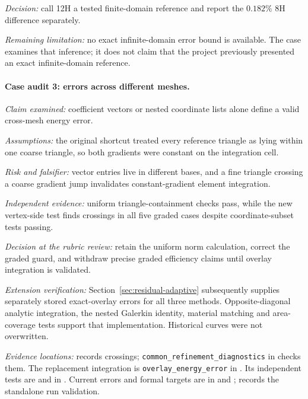 \documentclass[11pt]{article}
\begin{document}
\noindent\textit{Decision:} call 12H a tested finite-domain reference and report the $0.182\%$ 8H difference separately.

\noindent\textit{Remaining limitation:} no exact infinite-domain error bound is available. The case examines that inference; it does not claim that the project previously presented an exact infinite-domain reference.

\newpage
\paragraph{Case audit 3: errors across different meshes.}

\noindent\textit{Claim examined:} coefficient vectors or nested coordinate lists alone define a valid cross-mesh energy error.

\noindent\textit{Assumptions:} the original shortcut treated every reference triangle as lying within one coarse triangle, so both gradients were constant on the integration cell.

\noindent\textit{Risk and falsifier:} vector entries live in different bases, and a fine triangle crossing a coarse gradient jump invalidates constant-gradient element integration.

\noindent\textit{Independent evidence:} uniform triangle-containment checks pass, while the new vertex-side test finds crossings in all five graded cases despite coordinate-subset tests passing.

\noindent\textit{Decision at the rubric review:} retain the uniform norm calculation, correct the graded guard, and withdraw precise graded efficiency claims until overlay integration is validated.

\noindent\textit{Extension verification:} Section~\ref{sec:residual-adaptive} subsequently supplies separately stored exact-overlay errors for all three methods. Opposite-diagonal analytic integration, the nested Galerkin identity, material matching and area-coverage tests support that implementation. Historical curves were not overwritten.

\begin{sloppypar}
\noindent\textit{Evidence locations:}  records crossings; \texttt{common\_refinement\_diagnostics} in  checks them. The replacement integration is \texttt{overlay\_energy\_error} in . Its independent tests are  and  in . Current errors and formal targets are in  and ;  records the standalone run validation.
\end{sloppypar}
\end{document}
